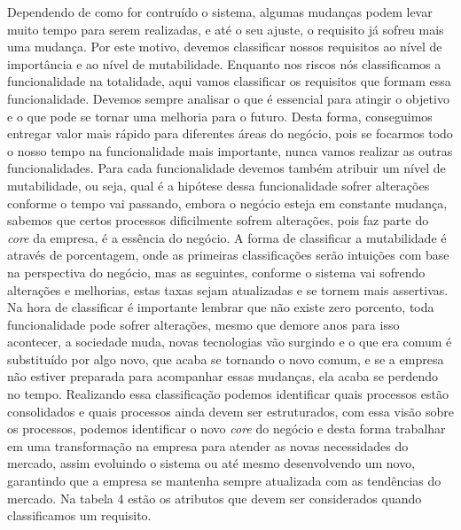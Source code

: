         Dependendo de como for contruído o sistema, algumas mudanças podem levar
        muito tempo para serem realizadas, e até o seu ajuste, o requisito já sofreu
        mais uma mudança. Por este motivo, devemos classificar nossos requisitos
        ao nível de importância e ao nível de mutabilidade. Enquanto nos riscos
        nós classificamos a funcionalidade na totalidade, aqui vamos classificar
        os requisitos que formam essa funcionalidade. Devemos sempre analisar o que
        é essencial para atingir o objetivo e o que pode se tornar uma melhoria para
        o futuro. Desta forma, conseguimos entregar valor mais rápido para diferentes
        áreas do negócio, pois se focarmos todo o nosso tempo na funcionalidade
        mais importante, nunca vamos realizar as outras funcionalidades. Para cada
        funcionalidade devemos também atribuir um nível de mutabilidade, ou seja,
        qual é a hipótese dessa funcionalidade sofrer alterações conforme o tempo
        vai passando, embora o negócio esteja em constante mudança, sabemos que
        certos processos dificilmente sofrem alterações, pois faz parte do \textit{core}
        da empresa, é a essência do negócio. A forma de classificar a mutabilidade
        é através de porcentagem, onde as primeiras classificações serão intuições
        com base na perspectiva do negócio, mas as seguintes, conforme o sistema
        vai sofrendo alterações e melhorias, estas taxas sejam atualizadas e se
        tornem mais assertivas. Na hora de classificar é importante lembrar que
        não existe zero porcento, toda funcionalidade pode sofrer alterações,
        mesmo que demore anos para isso acontecer, a sociedade muda, novas
        tecnologias vão surgindo e o que era comum é substituído por algo novo,
        que acaba se tornando o novo comum, e se a empresa não estiver preparada
        para acompanhar essas mudanças, ela acaba se perdendo no tempo. Realizando
        essa classificação podemos identificar quais processos estão consolidados
        e quais processos ainda devem ser estruturados, com essa visão sobre os
        processos, podemos identificar o novo \textit{core} do negócio e desta
        forma trabalhar em uma transformação na empresa para atender as novas
        necessidades do mercado, assim evoluindo o sistema ou até mesmo desenvolvendo
        um novo, garantindo que a empresa se mantenha sempre atualizada com as
        tendências do mercado. Na tabela 4 estão os atributos que devem ser
        considerados quando classificamos um requisito. \newline

